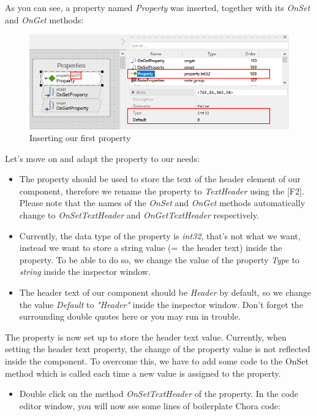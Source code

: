 \documentclass[
  a4paper,
,tablecaptionabove
]{scrbook}
\begin{document}
As you can see, a property named \emph{Property} was inserted, together
with its \emph{OnSet} and \emph{OnGet} methods:

\begin{figure}
\centering
\includegraphics{./../asciidoc/modules/ROOT/assets/images/reusablecomponent/NewProperty.png}
\caption{Inserting our first property}
\end{figure}

Let's move on and adapt the property to our needs:

\begin{itemize}
\item
  The property should be used to store the text of the header element of
  our component, therefore we rename the property to \emph{TextHeader}
  using the {[}F2{]}. Please note that the names of the \emph{OnSet}
  and \emph{OnGet} methods automatically change to
  \emph{OnSetTextHeader} and \emph{OnGetTextHeader} respectively.
\item
  Currently, the data type of the property is \emph{int32}, that's not
  what we want, instead we want to store a string value (=~the header
  text) inside the property. To be able to do so, we change the value of
  the property \emph{Type} to \emph{string} inside the inspector window.
\item
  The header text of our component should be \emph{Header} by default,
  so we change the value \emph{Default} to \emph{"Header"} inside the
  inspector window. Don't forget the surrounding double quotes here or
  you may run in trouble.
\end{itemize}

The property is now set up to store the header text value. Currently,
when setting the header text property, the change of the property value
is not reflected inside the component. To overcome this, we have to add
some code to the OnSet method which is called each time a new value is
assigned to the property.

\begin{itemize}
\item
  Double click on the method \emph{OnSetTextHeader} of the property. In
  the code editor window, you will now see some lines of boilerplate
  Chora code:
\end{itemize}
\end{document}
